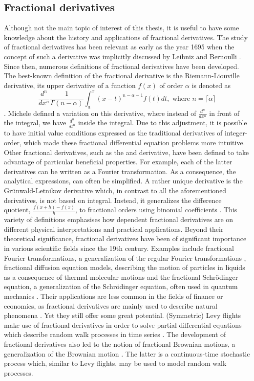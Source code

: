 \subsection{Fractional derivatives}
Although not the main topic of interest of this thesis, it is useful to have some knowledge about the history and applications of fractional derivatives. The study of fractional derivatives has been relevant as early as the year 1695 when the concept of such a derivative was implicitly discussed by Leibniz and Bernoulli \cite{katugampola2014}. Since then, numerous definitions of fractional derivatives have been developed. The best-known definition of the fractional derivative is the Riemann-Liouville derivative, its upper derivative of a function \(f(x)\) of order \(\alpha\) is denoted as 
\[\frac{d^n}{dx^n}\frac{1}{\Gamma(n -\alpha)} \int_{a}^{x} (x-t)^{n - \alpha -1} f(t) dt, \text{ where }n = \lceil\alpha \rceil \] \cite{kilbas2006}.
Michele \cite{caputo1967} defined a variation on this derivative, where instead of \(\frac{d^n}{dx^n}\) in front of the integral, we have \(\frac{d^n}{dt^n}\) inside the integral. Due to this adjustment, it is possible to have initial value conditions expressed as the traditional derivatives of integer-order, which made these fractional differential equation problems more intuitive. Other fractional derivatives, such as the \cite{hadamard1892} and \cite{riesz1949} derivative, have been defined to take advantage of particular beneficial properties. For example, each of the latter derivatives can be written as a Fourier transformation. As a consequence, the analytical expressions, can often be simplified. A rather unique derivative is the Grünwald-Letnikov derivative which, in contrast to all the aforementioned derivatives, is not based on integral. Instead, it generalizes the difference quotient, \(\frac{f(x+h) - f(x)}{h}\),  to fractional orders using binomial coefficients \cite{atici2021}. This variety of definitions emphasises how dependent fractional derivatives are  on different physical interpretations and practical applications.
Beyond their theoretical significance, fractional derivatives have been of significant importance in various scientific fields since the 19th century. Examples include fractional Fourier transformations, a generalization of the regular Fourier transformations \cite{missbauer2012}, fractional diffusion equation models, describing the motion of particles in liquids as a consequence of thermal molecular motions \cite{einstein1905} and the fractional Schrödinger equation, a generalization of the Schrödinger equation, often used in quantum mechanics \cite{laskin2002}. Their applications are less common in the fields of finance or economics, as fractional derivatives are mainly used to describe natural phenomena \cite{boulaaras2023}. Yet they still offer some great potential. (Symmetric) Levy flights make use of fractional derivatives in order to solve partial differential equations which describe random walk processes in time series \cite{scalas2000}. The development of fractional derivatives also led to the notion of fractional Brownian motions, a generalization of the Brownian motion \cite{mandelbrot1968}. The latter is a continuous-time stochastic process which, similar to Levy flights, may be used to model random walk processes.